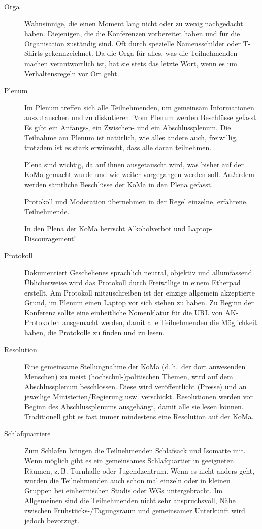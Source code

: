 \begin{description}
\item[Orga]
    Wahnsinnige, die einen Moment lang nicht oder zu wenig nachgedacht haben. Diejenigen, die die Konferenzen vorbereitet haben und für die Organisation zuständig sind. Oft durch spezielle Namensschilder oder T-Shirts gekennzeichnet.
    Da die Orga für alles, was die Teilnehmenden machen verantwortlich ist, hat sie stets das letzte Wort, wenn es um Verhaltensregeln vor Ort geht.

\item[Plenum]
    Im Plenum treffen sich alle Teilnehmenden, um gemeinsam Informationen auszutauschen und zu diskutieren. Vom Plenum werden Beschlüsse gefasst. Es gibt ein Anfangs-, ein Zwischen- und ein Abschlussplenum. Die Teilnahme am Plenum ist natürlich, wie alles andere auch, freiwillig, trotzdem ist es stark erwünscht, dass alle daran teilnehmen.
    
    Plena sind wichtig, da auf ihnen ausgetauscht wird, was bisher auf der KoMa gemacht wurde und wie weiter vorgegangen werden soll. Außerdem werden sämtliche Beschlüsse der KoMa in den Plena gefasst.
    
	Protokoll und Moderation übernehmen in der Regel einzelne, erfahrene, Teilnehmende.
    
    In den Plena der KoMa herrscht Alkoholverbot und Laptop-Discouragement!

\item[Protokoll]
    Dokumentiert Geschehenes sprachlich neutral, objektiv und allumfassend. Üblicherweise wird das Protokoll durch Freiwillige in einem Etherpad erstellt. Am Protokoll mitzuschreiben ist der einzige allgemein akzeptierte Grund, im Plenum einen Laptop vor sich stehen zu haben.
	Zu Beginn der Konferenz sollte eine einheitliche Nomenklatur für die URL von AK-Protokollen ausgemacht werden, damit alle Teilnehmenden die Möglichkeit haben, die Protokolle zu finden und zu lesen.

\item[Resolution]
    Eine gemeinsame Stellungnahme der KoMa (d.\,h.\ der dort anwesenden Menschen) zu meist (hochschul-)politischen Themen, wird auf dem Abschlussplenum beschlossen.
    Diese wird veröffentlicht (Presse) und an jeweilige Ministerien/Regierung usw. verschickt.
    Resolutionen werden vor Beginn des Abschlussplenums ausgehängt, damit alle sie lesen können. Traditionell gibt es fast immer mindestens eine Resolution auf der KoMa.

\item[Schlafquartiere]
    Zum Schlafen bringen die Teilnehmenden Schlafsack und Isomatte mit. Wenn möglich gibt es ein gemeinsames Schlafquartier in geeigneten Räumen, z.\,B. Turnhalle oder Jugendzentrum. Wenn es nicht anders geht, wurden die Teilnehmenden auch schon mal einzeln oder in kleinen Gruppen bei einheimischen Studis oder WGs untergebracht. 
    Im Allgemeinen sind die Teilnehmenden nicht sehr anspruchsvoll, Nähe zwischen Frühstücks-/Tagungsraum und gemeinsamer Unterkunft wird jedoch bevorzugt.


\end{description}
